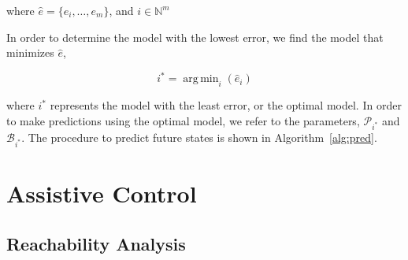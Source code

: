 \documentclass[letterpaper, 10 pt, conference]{ieeeconf}  %
\DeclareMathOperator*{\argmin}{arg\,min}
\newcommand\NB[1]{$\spadesuit$\footnote{NB: #1}}
\begin{document}
where $\hat{e} = \{e_i,\ldots,e_m\}$, and $i\in\mathbb{N}^m$

In order to determine the model with the lowest error, we find the model that minimizes $\hat{e}$,

\begin{equation}
    i^* = \argmin_{i}(\hat{e}_{i})
\end{equation}

where $i^*$ represents the model with the least error, or the optimal model. In order to make predictions using the optimal model, we refer to the parameters, $\mathcal{P}_{i^*}$ and $\mathcal{B}_{i^*}$. The procedure to predict future states is shown in Algorithm~\ref{alg:pred}.




\section{Assistive Control} \label{sec:adapt}


\subsection{Reachability Analysis}
\end{document}
